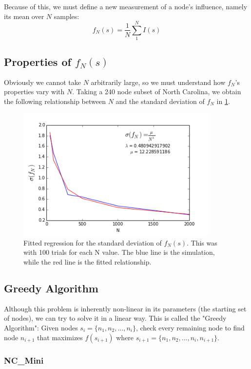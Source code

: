 \documentclass{article}
\begin{document}
	Because of this, we must define a new measurement of a node's influence, namely its mean over $N$ samples:
		\begin{equation}
		\boxed{
			f_N(s) = \frac{1}{N}\sum_1^N I(s)
		}
		\end{equation}
		
		
		
	\subsection{Properties of $f_N(s)$}
	Obviously we cannot take $N$ arbitrarily large, so we must understand how $f_N$'s properties vary with $N$. Taking a 240 node subset of North Carolina, we obtain the following relationship between $N$ and the standard deviation of $f_N$ in \ref{fig:lambda}.
	
		\begin{figure}[h!]
			\centering
			\includegraphics[width=100mm]{lambda_regression.png}
			\caption{Fitted regression for the standard deviation of $f_N(s)$. This was with 100 trials for each N value. The blue line is the simulation, while the red line is the fitted relationship.}
			\label{fig:lambda}
		\end{figure}
			
	
	\subsection{Greedy Algorithm}
		Although this problem is inherently non-linear in its parameters (the starting set of nodes), we can try to solve it in a linear way. This is called the "Greedy Algorithm":
		Given nodes $s_i = \{n_1, n_2,..., n_i\}$, check every remaining node to find node ${n_{i+1}}$ that maximizes $f(s_{i+1})$ where $s_{i+1} =  \{n_1, n_2, ..., n_i, n_{i+1}\}$.

	\subsubsection{NC\_Mini}
\end{document}

